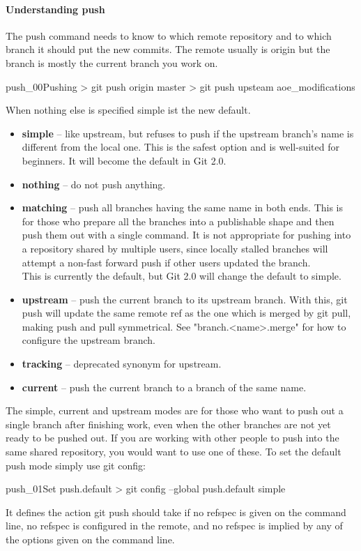 \paragraph{Understanding push}
The push command needs to know to which remote repository and to which branch it should put the new commits. The remote usually is origin but the branch is mostly the current branch you work on.
\begin{codelisting}{push_00}{Pushing}
> git push origin master
> git push upsteam aoe_modifications
\end{codelisting}
When nothing else is specified simple ist the new default.
\begin{itemize}
\item\textbf{simple} – like upstream, but refuses to push if the upstream branch’s name is different from the local one. This is the safest option and is well-suited for beginners. It will become the default in Git 2.0.
\item\textbf{nothing} – do not push anything.
\item\textbf{matching} – push all branches having the same name in both ends. This is for those who prepare all the branches into a publishable shape and then push them out with a single command. It is not appropriate for pushing into a repository shared by multiple users, since locally stalled branches will attempt a non-fast forward push if other users updated the branch.\\
This is currently the default, but Git 2.0 will change the default to simple.
\item\textbf{upstream} – push the current branch to its upstream branch. With this, git push will update the same remote ref as the one which is merged by git pull, making push and pull symmetrical. See "branch.<name>.merge" for how to configure the upstream branch.
\item\textbf{tracking} – deprecated synonym for upstream.
\item\textbf{current} – push the current branch to a branch of the same name.
\end{itemize}
The simple, current and upstream modes are for those who want to push out a single branch after finishing work, even when the other branches are not yet ready to be pushed out. If you are working with other people to push into the same shared repository, you would want to use one of these.
To set the default push mode simply use git config:
\begin{codelisting}{push_01}{Set push.default}
> git config --global push.default simple
\end{codelisting}
It defines the action git push should take if no refspec is given on the command line, no refspec is configured in the remote, and no refspec is implied by any of the options given on the command line.
